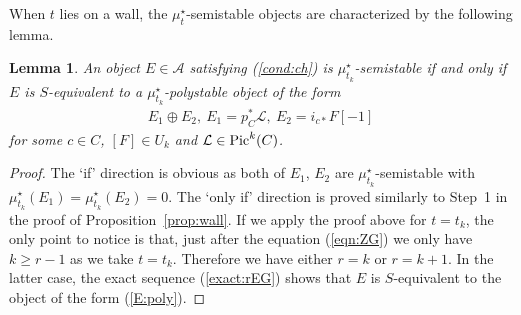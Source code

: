 \documentclass[11pt]{amsart}
\theoremstyle{plain}
\newtheorem{lem}[thm]{Lemma}
\newcommand{\aA}{\mathcal{A}}
\newcommand{\lL}{\mathcal{L}}
\newcommand{\Pic}{\mathop{\rm Pic}\nolimits}
\begin{document}
When $t$ lies on a wall, 
the $\mu_t^{\star}$-semistable objects are 
characterized by the following lemma. 
\begin{lem}\label{lem:wall}
An object $E \in \aA$ 
satisfying (\ref{cond:ch}) is $\mu_{t_k}^{\star}$-semistable 
if and only if 
$E$ is 
$S$-equivalent to a $\mu_{t_k}^{\star}$-polystable 
object of the form 
\begin{align}\label{E:poly}
E_1 \oplus E_2, \ 
E_1=p_C^{\ast}\lL, \ 
E_2=i_{c\ast}F[-1]
\end{align}
for some $c \in C$, $[F] \in U_k$
and $\lL \in \Pic^k(C)$. 
\end{lem}
\begin{proof}
The `if' direction is obvious as 
both of $E_1$, $E_2$ are $\mu_{t_k}^{\star}$-semistable
with $\mu_{t_k}^{\star}(E_1)=\mu_{t_k}^{\star}(E_2)=0$. 
The `only if' direction 
is proved similarly to 
Step~1 in the proof of Proposition~\ref{prop:wall}. 
If we apply the proof above
for $t=t_k$, the only
point to notice is that, 
just after the equation (\ref{eqn:ZG})
we only have $k\ge r-1$
as we take $t=t_k$. 
Therefore we have either $r=k$ or $r=k+1$. 
In the latter case, the exact sequence 
(\ref{exact:rEG})
shows that $E$ is $S$-equivalent to the 
object of the form (\ref{E:poly}). 
\end{proof}
\end{document}
